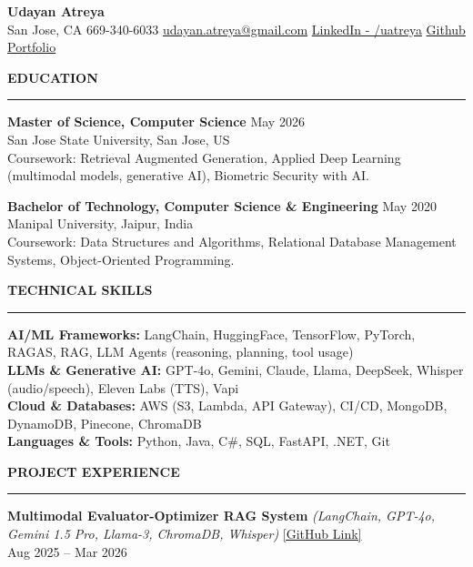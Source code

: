 \documentclass[letterpaper,10.5pt]{extarticle}
\newcommand{\resumesection}[1]{%
    \vspace{6pt}%
    \noindent\textbf{#1}\vspace{-5pt}%
    \\\noindent\rule{\textwidth}{0.5pt}%
    \vspace{1pt}%
}
\begin{document}
\begin{center}
    {\LARGE\textbf{Udayan Atreya}}\\[3pt]
    {\fontsize{11}{13.2}\selectfont
    San Jose, CA \textbar{} 669-340-6033 \textbar{}
    \href{mailto:udayan.atreya@gmail.com}{udayan.atreya@gmail.com} \textbar{}
    \href{https://www.linkedin.com/in/uatreya/}{LinkedIn - /uatreya} \textbar{}
    \href{https://github.com/slowloris-98/}{Github} \textbar{}
    \href{https://udayan-atreya.vercel.app/}{Portfolio}}
\end{center}

\resumesection{EDUCATION}

\noindent\textbf{Master of Science, Computer Science} \hfill May 2026\\
San Jose State University, San Jose, US\\
Coursework: Retrieval Augmented Generation, Applied Deep Learning (multimodal models, generative AI), Biometric Security with AI.

\vspace{4pt}

\noindent\textbf{Bachelor of Technology, Computer Science \& Engineering} \hfill May 2020\\
Manipal University, Jaipur, India\\
Coursework: Data Structures and Algorithms, Relational Database Management Systems, Object-Oriented Programming.

\resumesection{TECHNICAL SKILLS}

\noindent\textbf{AI/ML Frameworks:} LangChain, HuggingFace, TensorFlow, PyTorch, RAGAS, RAG, LLM Agents (reasoning, planning, tool usage)\\
\noindent\textbf{LLMs \& Generative AI:} GPT-4o, Gemini, Claude, Llama, DeepSeek, Whisper (audio/speech), Eleven Labs (TTS), Vapi\\
\noindent\textbf{Cloud \& Databases:} AWS (S3, Lambda, API Gateway), CI/CD, MongoDB, DynamoDB, Pinecone, ChromaDB\\
\noindent\textbf{Languages \& Tools:} Python, Java, C\#, SQL, FastAPI, .NET, Git

\resumesection{PROJECT EXPERIENCE}

\noindent\textbf{Multimodal Evaluator-Optimizer RAG System}
\textit{(LangChain, GPT-4o, Gemini 1.5 Pro, Llama-3, ChromaDB, Whisper)} \hfill \href{https://github.com/slowloris-98/Evaluator-Optimizer-RAG}{[GitHub Link]} \\
Aug 2025 -- Mar 2026
\end{document}
